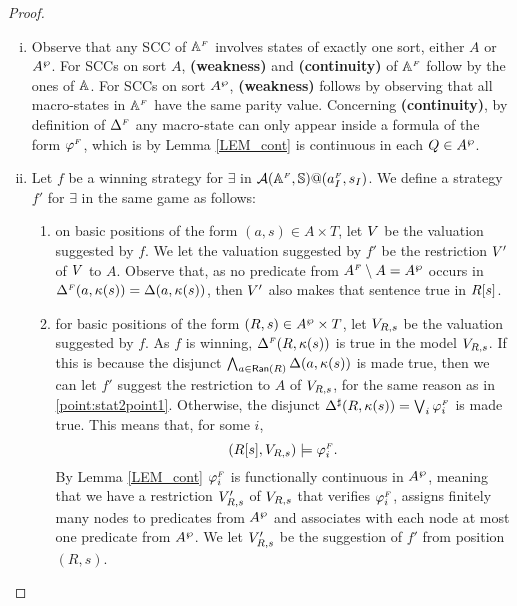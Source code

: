 \begin{proof}
\begin{enumerate}[(i)]
\item Observe that any SCC
of $\mathbb{A}^{{\scriptscriptstyle F}}$ involves states of exactly one sort, either $A$ or $A^{\wp}$. For SCCs on sort $A$, \textbf{(weakness)} and \textbf{(continuity)} of $\mathbb{A}^{{\scriptscriptstyle F}}$ follow by the ones of $\mathbb{A}$. For SCCs on sort $A^{\wp}$, \textbf{(weakness)} follows by observing that all macro-states in $\mathbb{A}^{{\scriptscriptstyle F}}$ have the same parity value. Concerning \textbf{(continuity)}, by definition of $\Delta^{{\scriptscriptstyle F}}$ any macro-state can only appear inside a formula of the form $\varphi^{{\scriptscriptstyle F}}$, which is by Lemma \ref{LEM_cont} is continuous in each $Q \in A^{\wp}$.
  \item  Let $f$ be a winning strategy for $\exists$ in $\mathcal{A}(\mathbb{A}^{{\scriptscriptstyle F}},\mathbb{S})@(a_I^{{\scriptscriptstyle F}},s_I)$. We define a strategy $f'$ for $\exists$ in the same game as follows:
      \begin{enumerate}[label=(\alph*),ref=\alph*]
        \item on basic positions of the form $(a,s) \in A\times T$, let $V$ be the valuation suggested by $f$. We let the valuation suggested by $f'$ be the restriction $V'$ of $V$ to $A$. Observe that, as no predicate from $A^{{\scriptscriptstyle F}}\setminus A =A^{\wp}$ occurs in $\Delta^{{\scriptscriptstyle F}}(a,\kappa(s)) = \Delta(a,\kappa(s))$, then $V'$ also makes that sentence true in $R[s]$.
        \begin{comment} With minimality
        on basic positions of the form $(a,s) \in A\times T$, $f'$ is defined as $f$. Indeed, as no predicate from $\shA$ occurs in $\tmap^{\fin}(a,\V(s))$, we can assume that the valuation suggested by $f$ does not assign any of them to nodes in $\R{s}$.
        \end{comment}
        \label{point:stat2point1}
        \item for basic positions of the form $(R,s) \in A^{\wp} \times T$, let $V_{R,s}$ be the valuation suggested by $f$. As $f$ is winning, $\Delta^{{\scriptscriptstyle F}}(R,\kappa(s))$ is true in the model $V_{R,s}$. If this is because the disjunct $\bigwedge_{a \in \mathsf{Ran}(R)} \Delta(a,\kappa(s))$ is made true, then we can let $f'$ suggest the restriction to $A$ of $V_{R,s}$, for the same reason as in \eqref{point:stat2point1}. Otherwise, the disjunct $\Delta^{\sharp}(R,\kappa(s)) = \bigvee_{i}\varphi_i^{{\scriptscriptstyle F}}$ is made true. This means that, for some $i$,
             $$(R[s], V_{R,s}) \models \varphi_i^{{\scriptscriptstyle F}}.$$
             By Lemma \ref{LEM_cont} $\varphi_i^{{\scriptscriptstyle F}}$ is functionally continuous in $A^{\wp}$, meaning that we have a restriction $V_{R,s}'$ of $V_{R,s}$ that verifies $\varphi_i^{{\scriptscriptstyle F}}$, assigns finitely many nodes to predicates from $A^{\wp}$ and associates with each node at most one predicate from $A^{\wp}$. We let $V_{R,s}'$ be the suggestion of $f'$ from position $(R,s)$.

\end{enumerate}
\end{enumerate}
\end{proof}
